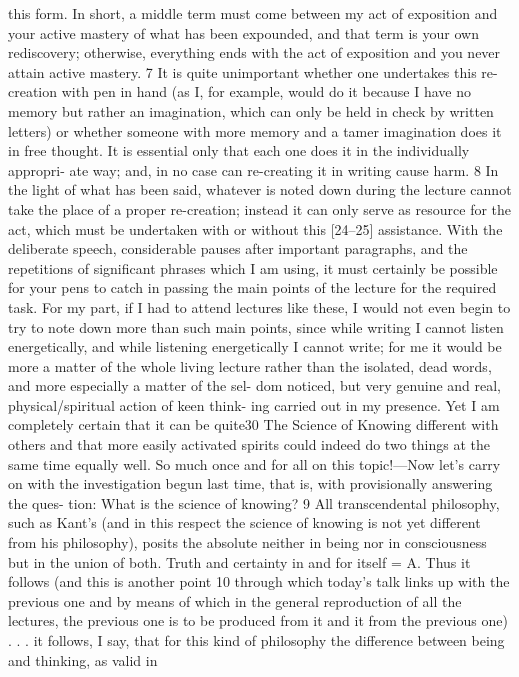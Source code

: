this form. In short, a middle term must come between my act of exposition
and your active mastery of what has been expounded, and that term is your
own rediscovery; otherwise, everything ends with the act of exposition and you
never attain active mastery. 7
It is quite unimportant whether one undertakes this re-creation with
pen in hand (as I, for example, would do it because I have no memory but
rather an imagination, which can only be held in check by written letters) or
whether someone with more memory and a tamer imagination does it in free
thought. It is essential only that each one does it in the individually appropri-
ate way; and, in no case can re-creating it in writing cause harm. 8
In the light of what has been said, whatever is noted down during the
lecture cannot take the place of a proper re-creation; instead it can only serve
as resource for the act, which must be undertaken with or without this [24–25]
assistance. With the deliberate speech, considerable pauses after important
paragraphs, and the repetitions of significant phrases which I am using, it must
certainly be possible for your pens to catch in passing the main points of the
lecture for the required task. For my part, if I had to attend lectures like these,
I would not even begin to try to note down more than such main points, since
while writing I cannot listen energetically, and while listening energetically I
cannot write; for me it would be more a matter of the whole living lecture
rather than the isolated, dead words, and more especially a matter of the sel-
dom noticed, but very genuine and real, physical/spiritual action of keen think-
ing carried out in my presence. Yet I am completely certain that it can be quite30
The Science of Knowing
different with others and that more easily activated spirits could indeed do two
things at the same time equally well.
So much once and for all on this topic!—Now let’s carry on with the
investigation begun last time, that is, with provisionally answering the ques-
tion: What is the science of knowing? 9
All transcendental philosophy, such as Kant’s (and in this respect the
science of knowing is not yet different from his philosophy), posits the
absolute neither in being nor in consciousness but in the union of both. Truth
and certainty in and for itself = A. Thus it follows (and this is another point 10
through which today’s talk links up with the previous one and by means of
which in the general reproduction of all the lectures, the previous one is to be
produced from it and it from the previous one) . . . it follows, I say, that for
this kind of philosophy the difference between being and thinking, as valid in

